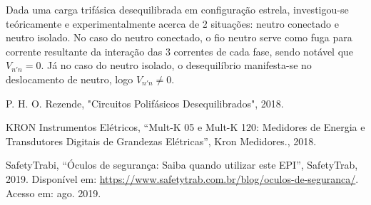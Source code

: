 \documentclass[a4paper,12pt,oneside,openany,table,xcdraw]{article}
\begin{document}
Dada uma carga trifásica desequilibrada em configuração estrela, investigou-se teóricamente e experimentalmente acerca de 2 situações: neutro conectado e neutro isolado. No caso do neutro conectado, o fio neutro serve como fuga para corrente resultante da interação das 3 correntes de cada fase, sendo notável que $V_{n'n}=0$. Já no caso do neutro isolado, o desequilíbrio manifesta-se no deslocamento de neutro, logo $V_{n'n}\ne 0$. 

\newpage
\begin{thebibliography}{9} 
    P. H. O. Rezende,
    "Circuitos Polifásicos Desequilibrados", 2018.

    KRON Instrumentos Elétricos,
    “Mult-K 05 e Mult-K 120: Medidores de Energia e Transdutores Digitais de Grandezas Elétricas”, Kron Medidores., 2018.


    SafetyTrabi,
    “Óculos de segurança: Saiba quando utilizar este EPI”, SafetyTrab, 2019.
 Disponível em:
 \url{https://www.safetytrab.com.br/blog/oculos-de-seguranca/}. Acesso em: ago. 2019.


\end{thebibliography}
\end{document}
